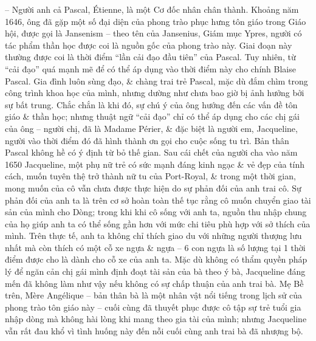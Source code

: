 \documentclass{article}
\begin{document}
\begin{enumerate}
\begin{itemize}
		-- Người anh cả {\sc Pascal, \'Etienne}, là một Cơ đốc nhân chân thành. Khoảng năm 1646, ông đã gặp một số đại diện của phong trào phục hưng tôn giáo trong Giáo hội, được gọi là Jansenism -- theo tên của Jansenius, Giám mục Ypres, người có tác phẩm thần học được coi là nguồn gốc của phong trào này. Giai đoạn này thường được coi là thời điểm ``lần cải đạo đầu tiên'' của {\sc Pascal}. Tuy nhiên, từ ``cải đạo'' quá mạnh mẽ để có thể áp dụng vào thời điểm này cho chính {\sc Blaise Pascal}. Gia đình luôn sùng đạo, \& chàng trai trẻ {\sc Pascal}, mặc dù đắm chìm trong công trình khoa học của mình, nhưng dường như chưa bao giờ bị ảnh hưởng bởi sự bất trung. Chắc chắn là khi đó, sự chú ý của ông hướng đến các vấn đề tôn giáo \& thần học; nhưng thuật ngữ ``cải đạo'' chỉ có thể áp dụng cho các chị gái của ông -- người chị, đã là Madame P\'erier, \& đặc biệt là người em, {\sc Jacqueline}, người vào thời điểm đó đã hình thành ơn gọi cho cuộc sống tu trì. Bản thân {\sc Pascal} không hề có ý định từ bỏ thế gian. Sau cái chết của người cha vào năm 1650 {\sc Jacqueline}, một phụ nữ trẻ có sức mạnh đáng kinh ngạc \& vẻ đẹp của tính cách, muốn tuyên thệ trở thành nữ tu của Port-Royal, \& trong một thời gian, mong muốn của cô vẫn chưa được thực hiện do sự phản đối của anh trai cô. Sự phản đối của anh ta là trên cơ sở hoàn toàn thế tục rằng cô muốn chuyển giao tài sản của mình cho Dòng; trong khi khi cô sống với anh ta, nguồn thu nhập chung của họ giúp anh ta có thể sống gần hơn với mức chi tiêu phù hợp với sở thích của mình. Trên thực tế, anh ta không chỉ thích giao du với những người thượng lưu nhất mà còn thích có một cỗ xe ngựa \& ngựa -- 6 con ngựa là số lượng tại 1 thời điểm được cho là dành cho cỗ xe của anh ta. Mặc dù không có thẩm quyền pháp lý để ngăn cản chị gái mình định đoạt tài sản của bà theo ý bà, {\sc Jacqueline} đáng mến đã không làm như vậy nếu không có sự chấp thuận của anh trai bà. Mẹ Bề trên, M\`ere Ang\'elique -- bản thân bà là một nhân vật nổi tiếng trong lịch sử của phong trào tôn giáo này -- cuối cùng đã thuyết phục được cô tập sự trẻ tuổi gia nhập dòng mà không hài lòng khi mang theo gia tài của mình; nhưng {\sc Jacqueline} vẫn rất đau khổ vì tình huống này đến nỗi cuối cùng anh trai bà đã nhượng bộ.
		

\end{itemize}
\end{enumerate}
\end{document}
